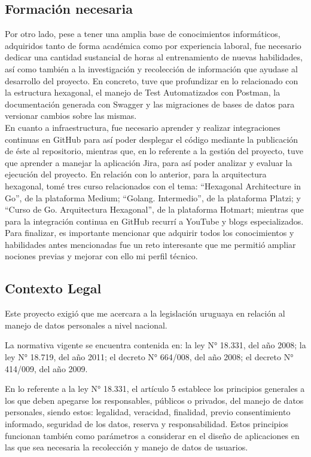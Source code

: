 \subsection{Formación necesaria}
Por otro lado, pese a tener una amplia base de conocimientos informáticos, adquiridos tanto de forma académica como por experiencia laboral, fue necesario dedicar una cantidad sustancial de horas al entrenamiento de nuevas habilidades, así como también a la investigación y recolección de información que ayudase al desarrollo del proyecto. En concreto, tuve que profundizar en lo relacionado con la estructura hexagonal, el manejo de Test Automatizados con Postman, la documentación generada con Swagger y las migraciones de bases de datos para versionar cambios sobre las mismas.\\
En cuanto a infraestructura, fue necesario aprender y realizar integraciones continuas en GitHub para así poder desplegar el código mediante la publicación de éste al repositorio, mientras que, en lo referente a la gestión del proyecto, tuve que aprender a manejar la aplicación Jira, para así poder analizar y evaluar la ejecución del proyecto.
En relación con lo anterior, para la arquitectura hexagonal, tomé tres curso relacionados con el tema: “Hexagonal Architecture in Go”, de la plataforma Medium; “Golang. Intermedio”, de la plataforma Platzi; y “Curso de Go. Arquitectura Hexagonal”, de la plataforma Hotmart; mientras que para la integración continua en GitHub recurrí a YouTube y blogs especializados. Para finalizar, es importante mencionar que adquirir todos los conocimientos y habilidades antes mencionadas fue un reto interesante que me permitió ampliar nociones previas y mejorar con ello mi perfil técnico.

\subsection{Contexto Legal}

Este proyecto exigió que me acercara a la legislación uruguaya en relación al manejo de datos personales a nivel nacional.

La normativa vigente se encuentra contenida en: la ley N° 18.331, del año 2008; la ley N° 18.719, del año 2011; el decreto N° 664/008, del año 2008; el decreto N° 414/009, del año 2009.

En lo referente a la ley N° 18.331, el artículo 5 establece los principios generales a los que deben apegarse los responsables, públicos o privados, del manejo de datos personales, siendo estos: legalidad, veracidad, finalidad, previo consentimiento informado, seguridad de los datos, reserva y responsabilidad. Estos principios funcionan también como parámetros a considerar en el diseño de aplicaciones en las que sea necesaria la recolección y manejo de datos de usuarios.
 
